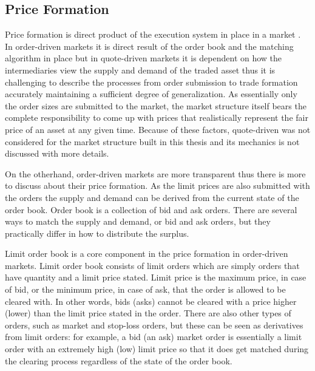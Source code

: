 \subsection{Price Formation}
Price formation is direct product of the execution system in place in a market
\citep{boer05}. In order-driven markets it is direct result of the order book and
the matching algorithm in place but in quote-driven markets it
is dependent on how the intermediaries view the supply and demand of the traded
asset thus it is challenging to describe the processes from order submission
to trade formation accurately maintaining a sufficient degree of generalization.
As essentially only the order sizes are submitted to the market, the market
structure itself bears the complete responsibility to come up with prices that realistically
represent the fair price of an asset at any given time. Because of these 
factors, quote-driven was not considered for the market structure built in this
thesis and its mechanics is not discussed with more details.

On the otherhand, order-driven markets are more transparent thus there is more
to discuss about their price formation. As the limit prices are also submitted with 
the orders the supply and demand can be derived from the current state of the 
order book. Order book is a collection of bid and ask orders. There are several ways 
to match the supply and demand, or bid and ask orders, but they practically differ 
in how to distribute the surplus.

Limit order book is a core component in the price formation in order-driven markets.
Limit order book consists of limit orders which are simply orders that have quantity and 
a limit price stated. Limit price is the maximum price, in case of bid, or the minimum
price, in case of ask, that the order is allowed to be cleared with. In other words,
bids (asks) cannot be cleared with a price higher (lower) than the limit price stated 
in the order. There are also other types of orders, such as market and 
stop-loss orders, but these can be seen as derivatives from limit orders: 
for example, a bid (an ask) market order is essentially a limit order 
with an extremely high (low) limit price so that it does get matched 
during the clearing process regardless of the state of the order book. 
\citep{lob13}


